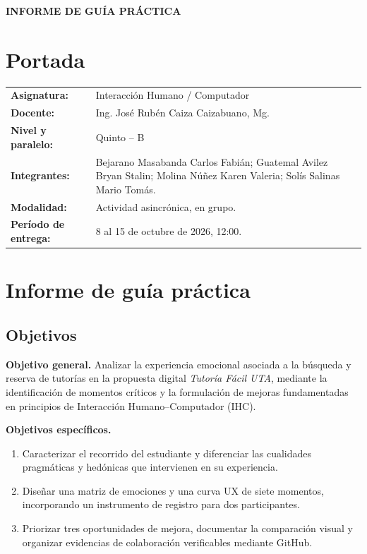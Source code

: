 \documentclass[10pt,letterpaper]{article}
\begin{document}
\begin{center}
 {\Large\bfseries INFORME DE GUÍA PRÁCTICA}\\[2pt]
\end{center}
\vspace{-4pt}
\section{Portada}
\begin{tabularx}{\linewidth}{@{}p{3.8cm}X@{}}
\textbf{Asignatura:}& Interacción Humano / Computador \\
\textbf{Docente:}& Ing. José Rubén Caiza Caizabuano, Mg. \\
\textbf{Nivel y paralelo:}& Quinto -- B \\
\textbf{Integrantes:}& Bejarano Masabanda Carlos Fabián; Guatemal Avilez Bryan Stalin; Molina Núñez Karen Valeria; Solís Salinas Mario Tomás.\\
\textbf{Modalidad:}& Actividad asincrónica, en grupo. \\
\textbf{Período de entrega:}& 8 al 15 de octubre de 2026, 12:00.\\
\end{tabularx}
\vspace{-5pt}
\section{Informe de guía práctica}
\subsection{Objetivos}
\textbf{Objetivo general.} Analizar la experiencia emocional asociada a la búsqueda y reserva de tutorías en la propuesta digital \textit{Tutoría Fácil UTA}, mediante la identificación de momentos críticos y la formulación de mejoras fundamentadas en principios de Interacción Humano--Computador (IHC).

\textbf{Objetivos específicos.}
\begin{enumerate}
\item Caracterizar el recorrido del estudiante y diferenciar las cualidades pragmáticas y hedónicas que intervienen en su experiencia.
\item Diseñar una matriz de emociones y una curva UX de siete momentos, incorporando un instrumento de registro para dos participantes.
\item Priorizar tres oportunidades de mejora, documentar la comparación visual y organizar evidencias de colaboración verificables mediante GitHub.
\end{enumerate}
\end{document}
